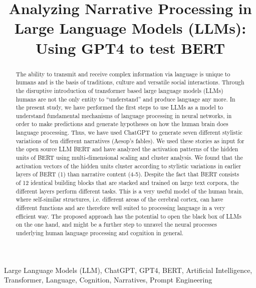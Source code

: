 
\title{Analyzing Narrative Processing in Large Language Models (LLMs): Using GPT4 to test BERT \\ 


}
\maketitle

\begin{abstract}
The ability to transmit and receive complex information via language is unique to humans and is the basis of traditions, culture and versatile social interactions. Through the disruptive introduction of transformer based large language models (LLMs) humans are not the only entity to “understand” and produce language any more. In the present study, we have performed the first steps to use LLMs as a model to understand fundamental mechanisms of language processing in neural networks, in order to make predictions and generate hypotheses on how the human brain does language processing. Thus, we have used ChatGPT to generate seven different stylistic variations of ten different narratives (Aesop’s fables). We used these stories as input for the open source LLM BERT and have analyzed the activation patterns of the hidden units of BERT using multi-dimensional scaling and cluster analysis. We found that the activation vectors of the hidden units cluster according to stylistic variations in earlier layers of BERT (1) than narrative content (4-5). Despite the fact that BERT consists of 12 identical building blocks that are stacked and trained on large text corpora, the different layers perform different tasks. This is a very useful model of the human brain, where self-similar structures, i.e. different areas of the cerebral cortex, can have different functions and are therefore well suited to processing language in a very efficient way. The proposed approach has the potential to open the black box of LLMs on the one hand, and might be a further step to unravel the neural processes underlying human language processing and cognition in general.
\end{abstract}

\begin{IEEEkeywords}
Large Language Models (LLM), ChatGPT, GPT4, BERT, Artificial Intelligence, Transformer, Language, Cognition, Narratives, Prompt Engineering
\end{IEEEkeywords}

